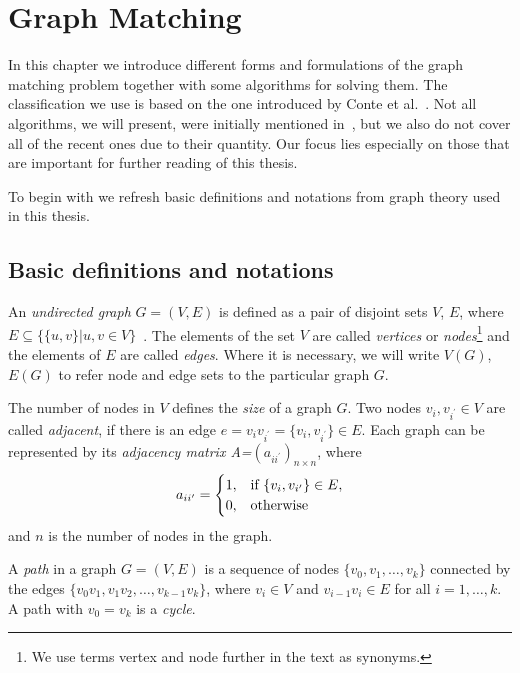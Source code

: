 
\chapter{Graph Matching} \label{chapter:GM}
In this chapter we introduce different forms and formulations of the graph matching problem together with some algorithms for solving them.
The classification we use is based on the one introduced by Conte et al.~\cite{Conte2004}. Not all algorithms, we will present, were initially mentioned in~\cite{Conte2004}, but we also do not cover all of the recent ones due to their quantity. Our focus lies especially on those that are important for further reading of this thesis.

To begin with we refresh basic definitions and notations from graph theory used in this thesis.
\section{Basic definitions and notations}
An \emph{undirected graph} $G=(V,E)$ is defined as a pair of disjoint sets $V$, $E$, where $E\subseteq\{\{u,v\}| u, v\in V\}$~\cite{Diestel2000}. The elements of the set $V$ are called \emph{vertices} or \emph{nodes}\footnote{We use terms vertex and node further in the text as synonyms.} and the elements of $E$ are called \emph{edges}. Where it is necessary, we will write $V(G)$, $E(G)$ to refer node and edge sets to the particular graph $G$.

The number of nodes in $V$ defines the \emph{size} of a graph $G$.
Two nodes $v_{i},v_{i^\prime}\in V$ are called \emph{adjacent}, if there is an edge $e=v_{i}v_{i^\prime}=\{v_{i},v_{i^\prime}\}\in E$. Each graph can be represented by its \emph{adjacency matrix A=$(a_{ii^\prime})_{n\times n}$}, where 
\begin{equation*}\centering
a_{ii^\prime}=\begin{cases}
 1, & \text{if } \{v_{i},v_{i^\prime}\}\in E, \\
 0, & \text{otherwise} \\
\end{cases}
\end{equation*}
and $n$ is the number of nodes in the graph.

A \emph{path} in a graph $G=(V,E)$ is a sequence of nodes $\{v_0,v_1,\dots,v_k\}$ connected by the edges $\{v_0v_1,v_1v_2,\dots,v_{k-1}v_k\}$, where $v_i\in V$ and $v_{i-1}v_i\in E$ for all $i=1,\dots,k$. A path with $v_0=v_k$ is a \emph{cycle}.

